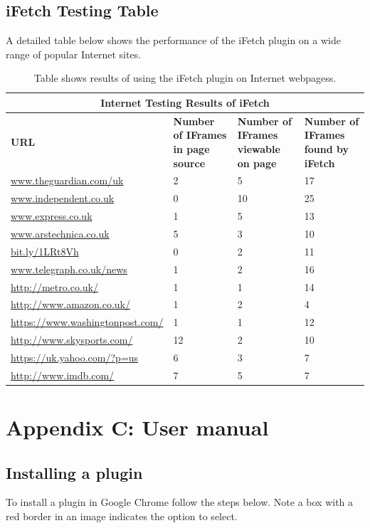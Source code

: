 \documentclass[12pt]{article}
\begin{document}
\subsection{iFetch Testing Table} \label{iFetchTesting}
A detailed table below shows the performance of the iFetch plugin on a wide range of popular Internet sites. 

{
\begin{table} [H]
\centering
\begin{tabular}{ |p{4cm}|p{3cm}|p{3cm}| p{3cm} | }
\hline
\multicolumn{4}{|c|}{\textbf{Internet Testing Results of iFetch}} \\
\hline
\textbf{URL} & \textbf{Number of IFrames in page source} & \textbf{Number of IFrames viewable on page} & \textbf{Number of IFrames found by iFetch} \\
\hline
\url{www.theguardian.com/uk} & 2 & 5 & 17 \\
\hline
\url{www.independent.co.uk} & 0 & 10 & 25 \\
\hline
\url{www.express.co.uk} & 1 & 5 & 13 \\
\hline
\url{www.arstechnica.co.uk} & 5 & 3 & 10  \\
\hline
\url{bit.ly/1LRt8Vh} & 0 & 2 & 11 \\
\hline
\url{www.telegraph.co.uk/news} & 1 & 2 & 16\\
\hline
\url{http://metro.co.uk/} & 1 & 1 & 14 \\
\hline
\url{http://www.amazon.co.uk/} & 1 & 2 & 4 \\
\hline
\url{https://www.washingtonpost.com/} & 1 & 1 & 12 \\
\hline
\url{http://www.skysports.com/} & 12 & 2 & 10\\
\hline
\url{https://uk.yahoo.com/?p=us} & 6 & 3 & 7 \\
\hline
\url{http://www.imdb.com/} & 7 & 5 & 7 \\
\hline
\end{tabular}
\caption{Table shows results of using the iFetch plugin on Internet webpagess.}
\label{table:5}
\end{table}
}

\section{Appendix C: User manual} \label{userman}

\subsection{Installing a plugin} \label{installPlugin}
To install a plugin in Google Chrome follow the steps below. Note a box with a red border in an image indicates the option to select. 
\end{document}
